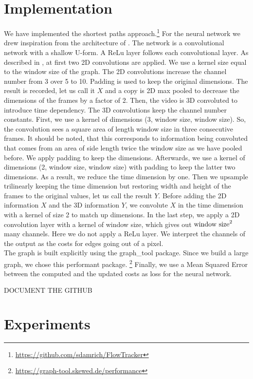 \documentclass{article}
\begin{document}
\section{Implementation}
We have implemented the shortest paths approach.\footnote{\url{https://github.com/sdamrich/FlowTracker}}  For the neural network we drew inspiration from the architecture of \cite{Lee17}. The network is a convolutional network with a shallow U-form. A ReLu layer follows each convolutional layer. As described in \cite{Lee17}, at first two 2D convolutions are applied. We use a kernel size equal to the window size of the graph. The 2D convolutions increase the channel number from 3 over 5 to 10. Padding is used to keep the original dimensions. The result is recorded, let us call it $X$ and a copy is 2D max pooled to decrease the dimensions of the frames by a factor of 2. Then, the video is 3D convoluted to introduce time dependency. The 3D convolutions keep the channel number constants.  First, we use a kernel of dimensions (3, window size, window size). So, the convolution sees a square area of length window size in three consecutive frames. It should be noted, that this corresponds to information being convoluted that comes from an area of side length twice the window size as we have pooled before. We apply padding to keep the dimensions. Afterwards, we use a kernel of dimensions (2, window size, window size) with padding to keep the latter two dimensions. As a result, we reduce the time dimension by one. Then we upsample trilinearly keeping the time dimension but restoring width and height of the frames to the original values, let us call the result $Y$. Before adding the 2D information $X$ and the 3D information $Y$, we convolute $X$ in the time dimension with a kernel of size 2 to match up dimensions. 
In the last step, we apply a 2D convolution layer with a kernel of window size, which gives out $\textnormal{window size}^2$ many channels. Here we do not apply a ReLu layer. We interpret the channels of the output as the costs for edges going out of a pixel.\\ 
The graph is built explicitly using the 
graph\_tool package. Since we build a large graph, we chose this performant package. \footnote{\url{https://graph-tool.skewed.de/performance}} Finally, we use a Mean Squared Error between the computed and the updated costs as loss for the neural network.

DOCUMENT THE GITHUB

\section{Experiments}
\end{document}
